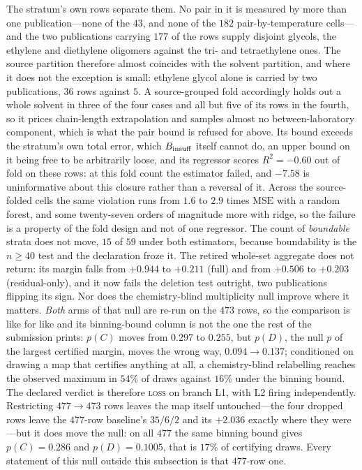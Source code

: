 The stratum's own rows separate them. No pair in it is measured by more than one
publication---none of the $43$, and none of the $182$ pair-by-temperature cells---and the two
publications carrying $177$ of the rows supply disjoint glycols, the ethylene and diethylene
oligomers against the tri- and tetraethylene ones. The source partition therefore almost coincides
with the solvent partition, and where it does not the exception is small: ethylene glycol alone is
carried by two publications, $36$ rows against $5$. A source-grouped fold accordingly holds out a
whole solvent in three of the four cases and all but five of its rows in the fourth, so it prices
chain-length extrapolation and samples almost no between-laboratory component, which is what the
pair bound is refused for above. Its bound
exceeds the stratum's own total error, which $B_{\mathrm{insuff}}$ itself cannot do, an upper bound on it being free to be arbitrarily loose, and its regressor
scores $R^2=-0.60$ out of fold on these rows: at this fold count the estimator failed, and $-7.58$
is uninformative about this closure rather than a reversal of it.
Across the source-folded cells the
same violation runs from $1.6$ to $2.9$
times $\mathrm{MSE}$ with a random forest, and some twenty-seven orders of magnitude more with
ridge, so the failure is a property of the fold design and not of one regressor.
The count of \emph{boundable} strata does not move, $15$ of $59$ under both estimators,
because boundability is the $n\ge40$ test and the declaration froze it. The retired whole-set
aggregate does not return: its margin falls from $+0.944$ to $+0.211$ (full) and from $+0.506$ to
$+0.203$ (residual-only), and it now fails the deletion test outright, two publications flipping its
sign. Nor does the chemistry-blind multiplicity null improve where it matters. \emph{Both} arms of
that null are re-run on the $473$ rows, so the comparison is like for like and its binning-bound
column is not the one the rest of the submission prints: $p(C)$ moves from $0.297$ to $0.255$, but
$p(D)$, the null $p$ of the largest
certified margin, moves the wrong way, $0.094\to0.137$; conditioned on drawing a map that certifies
anything at all, a chemistry-blind relabelling reaches the observed maximum in $54\%$ of draws
against $16\%$ under the binning bound. The declared verdict is therefore \textsc{loss} on branch L1,
with L2 firing independently. Restricting $477\to473$ rows leaves the map itself
untouched---the four dropped rows leave the $477$-row baseline's $35/6/2$ and its $+2.036$ exactly
where they were---but it does move the null: on all $477$ the same binning bound gives $p(C)=0.286$
and $p(D)=0.1005$, that is $17\%$ of certifying draws. Every statement of this null outside this
subsection is that $477$-row one.

